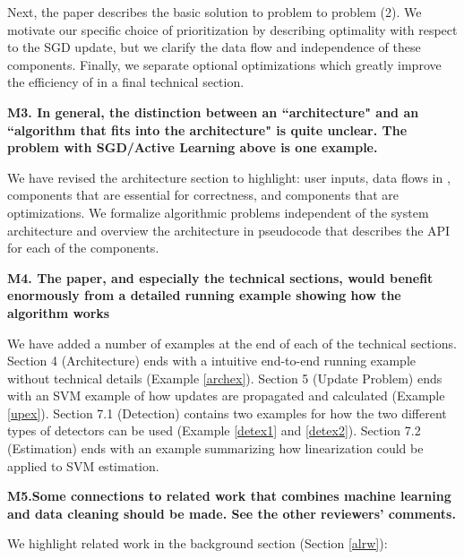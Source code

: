 Next, the paper describes the basic solution to problem to problem (2). We motivate our specific choice of prioritization by describing optimality with respect to the SGD update, but we clarify the data flow and independence of these components. 
Finally, we separate optional optimizations which greatly improve the efficiency of \sys in a final technical section.

\vspace{0.5em}

\noindent\textbf{M3. In general, the distinction between an ``architecture" and an ``algorithm that fits into the architecture" is quite unclear. The problem with SGD/Active Learning above is one example.}

We have revised the architecture section to highlight: user inputs, data flows in \sys, components that are essential for correctness, and components that are optimizations.
We formalize algorithmic problems independent of the system architecture and overview the architecture in pseudocode that describes the API for each of the components.

\vspace{0.5em}

\noindent\textbf{M4. The paper, and especially the technical sections, would benefit enormously from a detailed running example showing how the algorithm works}

We have added a number of examples at the end of each of the technical sections. Section 4 (Architecture) ends with a intuitive end-to-end running example without technical details (Example \ref{archex}).
Section 5 (Update Problem) ends with an SVM example of how updates are propagated and calculated (Example \ref{upex}).
Section 7.1 (Detection) contains two examples for how the two different types of detectors can be used (Example \ref{detex1} and \ref{detex2}).
Section 7.2 (Estimation) ends with an example summarizing how linearization could be applied to SVM estimation.

\vspace{0.5em}

\noindent\textbf{M5.Some connections to related work that combines machine learning and data cleaning should be made. See the other reviewers' comments.}

We highlight related work in the background section (Section \ref{alrw}):

